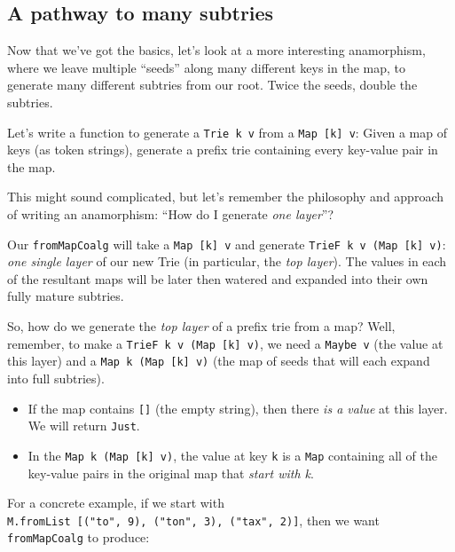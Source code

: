 \documentclass[]{article}
\begin{document}
\hypertarget{a-pathway-to-many-subtries}{%
\subsection{A pathway to many subtries}\label{a-pathway-to-many-subtries}}

Now that we've got the basics, let's look at a more interesting anamorphism,
where we leave multiple ``seeds'' along many different keys in the map, to
generate many different subtries from our root. Twice the seeds, double the
subtries.

Let's write a function to generate a \texttt{Trie\ k\ v} from a
\texttt{Map\ {[}k{]}\ v}: Given a map of keys (as token strings), generate a
prefix trie containing every key-value pair in the map.

This might sound complicated, but let's remember the philosophy and approach of
writing an anamorphism: ``How do I generate \emph{one layer}''?

Our \texttt{fromMapCoalg} will take a \texttt{Map\ {[}k{]}\ v} and generate
\texttt{TrieF\ k\ v\ (Map\ {[}k{]}\ v)}: \emph{one single layer} of our new Trie
(in particular, the \emph{top layer}). The values in each of the resultant maps
will be later then watered and expanded into their own fully mature subtries.

So, how do we generate the \emph{top layer} of a prefix trie from a map? Well,
remember, to make a \texttt{TrieF\ k\ v\ (Map\ {[}k{]}\ v)}, we need a
\texttt{Maybe\ v} (the value at this layer) and a
\texttt{Map\ k\ (Map\ {[}k{]}\ v)} (the map of seeds that will each expand into
full subtries).

\begin{itemize}
\tightlist
\item
  If the map contains \texttt{{[}{]}} (the empty string), then there \emph{is a
  value} at this layer. We will return \texttt{Just}.
\item
  In the \texttt{Map\ k\ (Map\ {[}k{]}\ v)}, the value at key \texttt{k} is a
  \texttt{Map} containing all of the key-value pairs in the original map that
  \emph{start with k}.
\end{itemize}

For a concrete example, if we start with
\texttt{M.fromList\ {[}("to",\ 9),\ ("ton",\ 3),\ ("tax",\ 2){]}}, then we want
\texttt{fromMapCoalg} to produce:
\end{document}

